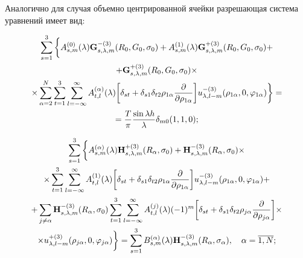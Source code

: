 \begin{russian}
Аналогично для случая объемно центрированной ячейки разрешающая система уравнений имеет вид:

\begin{multline}
\sum\limits_{s = 1}^3 \bigg\{  A_{s,m}^{(0)}(\lambda ){\bf{G}}_{s,\lambda ,m}^{ - (3)}({R_0},{G_0},{\sigma _0}) + A_{s,m}^{(1)}(\lambda ){\bf{G}}_{s,\lambda ,m}^{ + (3)}({R_0},{G_0},{\sigma _0}) + \\
+ {\bf{G}}_{s,\lambda ,m}^{ + (3)}({R_0},{G_0},{\sigma _0}) \times \\
\times \sum\limits_{\alpha  = 2}^N {\sum\limits_{t = 1}^3 {\sum\limits_{l =  - \infty }^\infty  {A_{t,l}^{(\alpha )}} } } (\lambda )\bigg[{\delta _{st}} + {\delta _{s1}}{\delta _{t2}}{\rho _{1\alpha }}\frac{\partial }{{\partial {\rho _{1\alpha }}}}\bigg]u_{\lambda ,l - m}^{ - (3)}({\rho _{1\alpha }},0,{\varphi _{1\alpha }})\bigg\}  = \\
= \frac{T}{\pi }\frac{{\sin \lambda h}}{\lambda }{\delta _{m0}}(1,1,0);
\end{multline}

\begin{multline}
\sum\limits_{s = 1}^3 \bigg\{  A_{s,m}^{(\alpha )}(\lambda ){\bf{H}}_{s,\lambda ,m}^{ + (3)}({R_\alpha },{\sigma _0}) + {\bf{H}}_{s,\lambda ,m}^{ - (3)}({R_\alpha },{\sigma _0}) \times \\
\times \sum\limits_{t = 1}^3 {\sum\limits_{l =  - \infty }^\infty  {A_{t,l}^{(1)}} } (\lambda )\bigg[{\delta _{st}} + {\delta _{s1}}{\delta _{t2}}{\rho _{1\alpha }}\frac{\partial }{{\partial {\rho _{1\alpha }}}}\bigg]u_{\lambda ,l - m}^{ - (3)}({\rho _{1\alpha }},0,{\varphi _{1\alpha }}) + \\
+ \sum\limits_{j \ne \alpha } {{\bf{H}}_{s,\lambda ,m}^{ - (3)}} ({R_\alpha },{\sigma _0})\sum\limits_{t = 1}^3 {\sum\limits_{l =  - \infty }^\infty  {A_{t,l}^{(j)}} } (\lambda ){( - 1)^m}\bigg[{\delta _{st}} + {\delta _{s1}}{\delta _{t2}}{\rho _{j\alpha }}\frac{\partial }{{\partial {\rho _{j\alpha }}}}\bigg] \times \\
\times u_{\lambda ,l - m}^{ + (3)}({\rho _{j\alpha }},0,{\varphi _{j\alpha }})\bigg\}  = \sum\limits_{s = 1}^3 {B_{s,m}^{(\alpha )}} (\lambda ){\bf{H}}_{s,\lambda ,m}^{ - (3)}({R_\alpha },{\sigma _\alpha }),\;\;\;{\mkern 1mu} {\kern 1pt} \alpha  = \overline {1,N};
\end{multline}


\end{russian}
